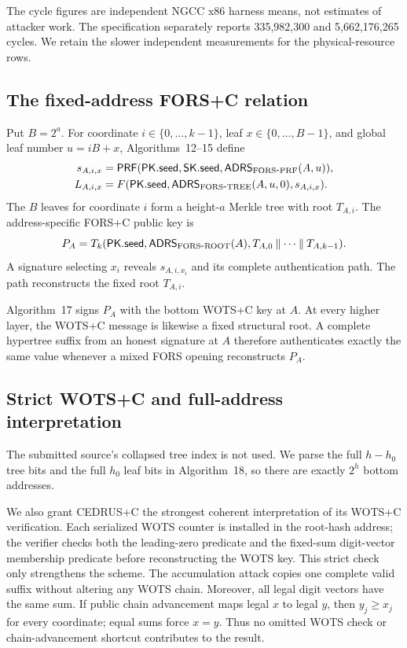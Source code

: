 \documentclass[11pt,a4paper]{article}
\newcommand{\concat}{\mathbin\Vert}
\newcommand{\PRF}{\ensuremath{\mathsf{PRF}}}
\newcommand{\pk}{\ensuremath{\mathsf{PK}}}
\newcommand{\sk}{\ensuremath{\mathsf{SK}}}
\begin{document}
The cycle figures are independent NGCC x86 harness means, not estimates of
attacker work.  The specification separately reports 335,982,300 and
5,662,176,265 cycles.  We retain the slower independent measurements for the
physical-resource rows.

\subsection{The fixed-address FORS+C relation}

Put $B=2^a$.  For coordinate $i\in\{0,\ldots,k-1\}$, leaf
$x\in\{0,\ldots,B-1\}$, and global leaf number $u=iB+x$, Algorithms~12--15
define
\begin{align}
 s_{A,i,x}&=\PRF(\pk.\mathsf{seed},\sk.\mathsf{seed},
              \mathsf{ADRS}_{\rm FORS\mbox{-}PRF}(A,u)),       \label{eq:secret}\\
 L_{A,i,x}&=F(\pk.\mathsf{seed},
              \mathsf{ADRS}_{\rm FORS\mbox{-}TREE}(A,u,0),
              s_{A,i,x}).                                    \label{eq:leaf}
\end{align}
The $B$ leaves for coordinate $i$ form a height-$a$ Merkle tree with root
$T_{A,i}$.  The address-specific FORS+C public key is
\begin{equation}
 P_A=T_k(\pk.\mathsf{seed},\mathsf{ADRS}_{\rm FORS\mbox{-}ROOT}(A),
          T_{A,0}\concat\cdots\concat T_{A,k-1}).              \label{eq:forspk}
\end{equation}
A signature selecting $x_i$ reveals $s_{A,i,x_i}$ and its complete
authentication path.  The path reconstructs the fixed root $T_{A,i}$.

Algorithm~17 signs $P_A$ with the bottom WOTS+C key at $A$.  At every higher
layer, the WOTS+C message is likewise a fixed structural root.  A complete
hypertree suffix from an honest signature at $A$ therefore authenticates
exactly the same value whenever a mixed FORS opening reconstructs $P_A$.

\subsection{Strict WOTS+C and full-address interpretation}

The submitted source's collapsed tree index is not used.  We parse the full
$h-h_0$ tree bits and the full $h_0$ leaf bits in Algorithm~18, so there are
exactly $2^h$ bottom addresses.

We also grant CEDRUS+C the strongest coherent interpretation of its WOTS+C
verification.  Each serialized WOTS counter is installed in the root-hash
address; the verifier checks both the leading-zero predicate and the fixed-sum
digit-vector membership predicate before reconstructing the WOTS key.  This
strict check only strengthens the scheme.  The accumulation attack copies one
complete valid suffix without altering any WOTS chain.  Moreover, all legal
digit vectors have the same sum.  If public chain advancement maps legal
$x$ to legal $y$, then $y_j\geq x_j$ for every coordinate; equal sums force
$x=y$.  Thus no omitted WOTS check or chain-advancement shortcut contributes
to the result.
\end{document}
